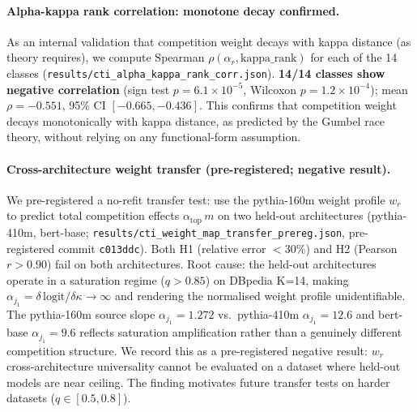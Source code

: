 \documentclass{article}
\begin{document}
\paragraph{Alpha-kappa rank correlation: monotone decay confirmed.}
As an internal validation that competition weight decays with kappa distance (as theory
requires), we compute Spearman $\rho(\alpha_r, \mathrm{kappa\_rank})$ for each of the 14
classes (\texttt{results/cti\_alpha\_kappa\_rank\_corr.json}).
\textbf{14/14 classes show negative correlation} (sign test $p=6.1\times10^{-5}$,
Wilcoxon $p=1.2\times10^{-4}$); mean $\rho=-0.551$, 95\% CI $[-0.665, -0.436]$.
This confirms that competition weight decays monotonically with kappa distance, as
predicted by the Gumbel race theory, without relying on any functional-form assumption.

\paragraph{Cross-architecture weight transfer (pre-registered; negative result).}
We pre-registered a no-refit transfer test: use the pythia-160m weight profile $w_r$ to
predict total competition effects $\alpha_\mathrm{top}\,m$ on two held-out architectures
(pythia-410m, bert-base; \texttt{results/cti\_weight\_map\_transfer\_prereg.json},
pre-registered commit \texttt{c013ddc}).
Both H1 (relative error $<30\%$) and H2 (Pearson $r>0.90$) fail on both architectures.
Root cause: the held-out architectures operate in a saturation regime ($q>0.85$) on
DBpedia K=14, making $\alpha_{j_1} = \delta\,\mathrm{logit}/\delta\kappa \to \infty$
and rendering the normalised weight profile unidentifiable.
The pythia-160m source slope $\alpha_{j_1}=1.272$ vs.\ pythia-410m $\alpha_{j_1}=12.6$
and bert-base $\alpha_{j_1}=9.6$ reflects saturation amplification rather than a
genuinely different competition structure.
We record this as a pre-registered negative result: $w_r$ cross-architecture
universality cannot be evaluated on a dataset where held-out models are near ceiling.
The finding motivates future transfer tests on harder datasets ($q\in[0.5, 0.8]$).
\end{document}

